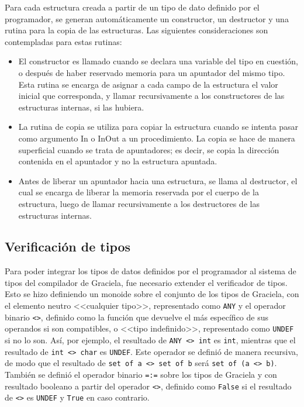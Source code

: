 {{Para cada estructura creada a partir de un tipo de dato definido por el programador,
se generan automáticamente un constructor, un destructor y una rutina para la
copia de las estructuras. Las siguientes consideraciones son contempladas para
estas rutinas:

\begin{itemize}

  \item El constructor es llamado cuando se declara una variable del tipo en
  cuestión, o después de haber reservado memoria para un apuntador del mismo
  tipo. Esta rutina se encarga de asignar a cada campo de la estructura el valor
  inicial que corresponda, y llamar recursivamente a los constructores de las
  estructuras internas, si las hubiera.

  \item La rutina de copia se utiliza para copiar la estructura cuando se
  intenta pasar como argumento In o InOut a un procedimiento. La copia se hace
  de manera superficial cuando se trata de apuntadores; es decir, se copia la
  dirección contenida en el apuntador y no la estructura apuntada.

  \item Antes de liberar un apuntador hacia una estructura, se llama al
  destructor, el cual se encarga de liberar la memoria reservada por el cuerpo
  de la estructura, luego de llamar recursivamente a los destructores de las
  estructuras internas.

\end{itemize}


\subsection{Verificación de tipos}

Para poder integrar los tipos de datos definidos por el programador al sistema
de tipos del compilador de Graciela, fue necesario extender el verificador de
tipos. Esto se hizo definiendo un monoide sobre el conjunto de los tipos de
Graciela, con el elemento neutro <<cualquier tipo>>, representado como
\texttt{ANY} y el operador binario \texttt{<>}, definido como la función que
devuelve el más específico de sus operandos si son compatibles, o <<tipo
indefinido>>, representado como \texttt{UNDEF} si no lo son. Así, por ejemplo,
el resultado de \texttt{ANY <>{} int} es \texttt{int}, mientras que el resultado
de \texttt{int <>{} char} es \texttt{UNDEF}. Este operador se definió de manera
recursiva, de modo que el resultado de \texttt{set of a <>{} set of b} será
\texttt{set of (a <>{} b)}. También se definió el operador binario \texttt{=:=}
sobre los tipos de Graciela y con resultado booleano a partir del operador
\texttt{<>}, definido como \texttt{False} si el resultado de \texttt{<>} es
\texttt{UNDEF} y \texttt{True} en caso contrario.

}}
